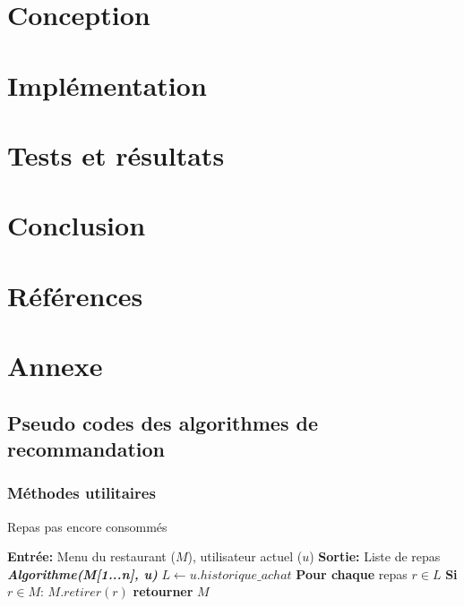 \documentclass[11pt]{article}
\begin{document}
\newpage
\section{Conception}

\newpage
\section{Implémentation}


\newpage
\section{Tests et résultats}

\newpage
\section{Conclusion}

\newpage
\section{Références}

\newpage
\section{Annexe}
\subsection{Pseudo codes des algorithmes de recommandation}

\subsubsection{Méthodes utilitaires}
\begin{algorithm}
    \caption{Repas pas encore consommés}
    \begin{algorithmic}[1]
    \Statex \textbf{Entrée:} Menu du restaurant ($M$), utilisateur actuel ($u$)
    \Statex \textbf{Sortie:} Liste de repas
    \State \textbf{\textit{Algorithme(M[1...n], u)}}
    \State \hspace{0.5cm} $L \leftarrow u.historique\_achat$
    \State \hspace{0.5cm} \textbf{Pour chaque} repas $r \in L$
    \State \hspace{1cm} \textbf{Si} $r \in M$:
    \State \hspace{1.5cm} $M.retirer(r)$
    \State \hspace{0.5cm} \textbf{retourner} $M$
    \end{algorithmic}
\end{algorithm}
\end{document}
